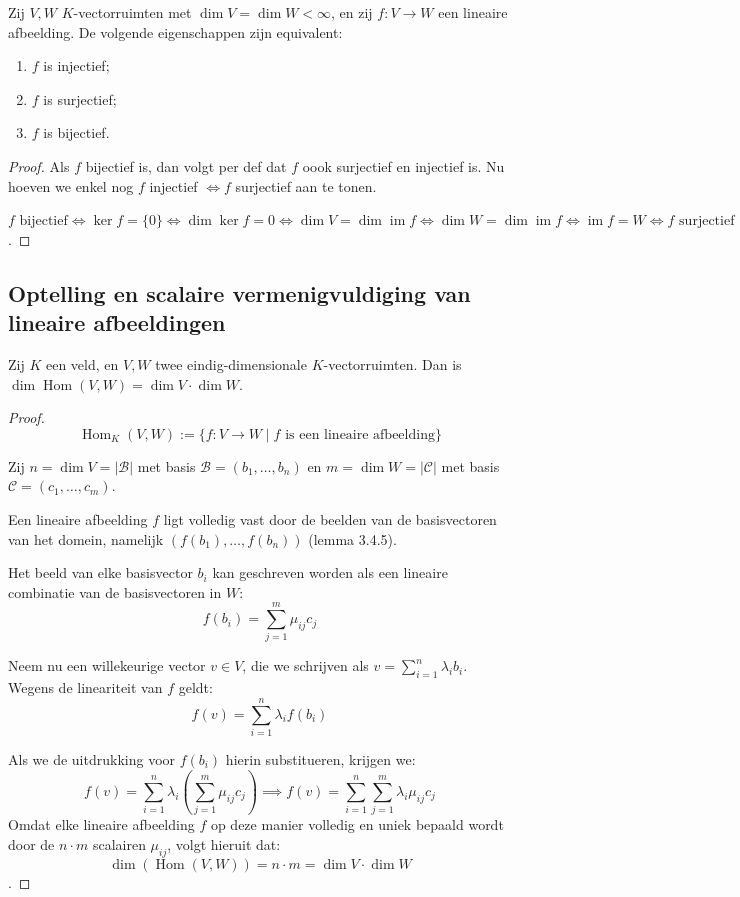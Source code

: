 \begin{gevolg}
    Zij $V, W$ $K$-vectorruimten met $\dim V = \dim W < \infty$, en zij $f \colon V \to W$ een lineaire afbeelding. De volgende eigenschappen zijn equivalent:
    \begin{enumerate}
        \item[(a)] $f$ is injectief;
        \item[(b)] $f$ is surjectief;
        \item[(c)] $f$ is bijectief.
    \end{enumerate}
\end{gevolg}
\begin{proof}
    Als \(f\) bijectief is, dan volgt per def dat \(f\) oook surjectief en injectief is.
    Nu hoeven we enkel nog \(f\) injectief \(\iff f\) surjectief aan te tonen.

    \(
        f \text{ bijectief}
        \iff \ker f = \{0\}
        \iff \dim\ker f = 0
        \iff \dim V = \dim\operatorname{im}f
        \iff \dim W = \dim\operatorname{im}f
        \iff \operatorname{im}f=W
        \iff f \text{ surjectief}
    \).
\end{proof}
\subsection{Optelling en scalaire vermenigvuldiging van lineaire afbeeldingen}

\begin{stelling}[3.4.5]
    Zij $K$ een veld, en $V, W$ twee eindig-dimensionale $K$-vectorruimten.
    Dan is $\dim \operatorname{Hom}(V, W) = \dim V \cdot \dim W$.
\end{stelling}
\begin{proof}
    $$ \operatorname{Hom}_K(V,W) := \{f \colon V \to W \mid f \text{ is een lineaire afbeelding}\} $$

    Zij $n = \dim V = |\mathcal{B}|$ met basis $\mathcal{B} = (b_1, \dots, b_n)$ en $m = \dim W = |\mathcal{C}|$ met basis $\mathcal{C} = (c_1, \dots, c_m)$.

    Een lineaire afbeelding $f$ ligt volledig vast door de beelden van de basisvectoren van het domein, namelijk $(f(b_1), \dots, f(b_n))$
    (lemma 3.4.5).

    Het beeld van elke basisvector $b_i$ kan geschreven worden als een lineaire combinatie van de basisvectoren in $W$:
    $$ f(b_i) = \sum_{j=1}^{m} \mu_{ij} c_j $$

    Neem nu een willekeurige vector $v \in V$, die we schrijven als $v = \sum_{i=1}^{n} \lambda_i b_i$. Wegens de lineariteit van $f$ geldt:
    $$ f(v) = \sum_{i=1}^{n} \lambda_i f(b_i) $$

    Als we de uitdrukking voor $f(b_i)$ hierin substitueren, krijgen we:
    \[
        f(v) = \sum_{i=1}^{n} \lambda_i \left( \sum_{j=1}^{m} \mu_{ij} c_j \right)
        \implies f(v) = \sum_{i=1}^{n} \sum_{j=1}^{m} \lambda_i \mu_{ij} c_j
    \]
    Omdat elke lineaire afbeelding $f$ op deze manier volledig en uniek bepaald wordt door de $n \cdot m$ scalairen $\mu_{ij}$, volgt hieruit dat:
    $$ \dim(\operatorname{Hom}(V,W)) = n \cdot m = \dim V \cdot \dim W $$.
\end{proof}
